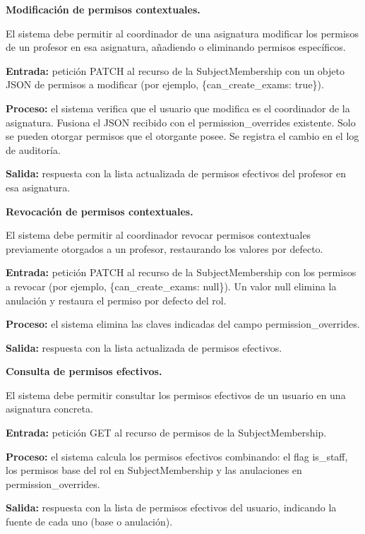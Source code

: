 \begin{functional}
\begin{functional}
    \item \textbf{Modificación de permisos contextuales.}

    El sistema debe permitir al coordinador de una asignatura modificar los permisos de un profesor en esa asignatura, añadiendo o eliminando permisos específicos.

    \textbf{Entrada:} petición PATCH al recurso de la SubjectMembership con un objeto JSON de permisos a modificar (por ejemplo, \{can\_create\_exams: true\}).

    \textbf{Proceso:} el sistema verifica que el usuario que modifica es el coordinador de la asignatura. Fusiona el JSON recibido con el permission\_overrides existente. Solo se pueden otorgar permisos que el otorgante posee. Se registra el cambio en el log de auditoría.

    \textbf{Salida:} respuesta con la lista actualizada de permisos efectivos del profesor en esa asignatura.

    \item \textbf{Revocación de permisos contextuales.}

    El sistema debe permitir al coordinador revocar permisos contextuales previamente otorgados a un profesor, restaurando los valores por defecto.

    \textbf{Entrada:} petición PATCH al recurso de la SubjectMembership con los permisos a revocar (por ejemplo, \{can\_create\_exams: null\}). Un valor null elimina la anulación y restaura el permiso por defecto del rol.

    \textbf{Proceso:} el sistema elimina las claves indicadas del campo permission\_overrides.

    \textbf{Salida:} respuesta con la lista actualizada de permisos efectivos.

    \item \textbf{Consulta de permisos efectivos.}

    El sistema debe permitir consultar los permisos efectivos de un usuario en una asignatura concreta.

    \textbf{Entrada:} petición GET al recurso de permisos de la SubjectMembership.

    \textbf{Proceso:} el sistema calcula los permisos efectivos combinando: el flag is\_staff, los permisos base del rol en SubjectMembership y las anulaciones en permission\_overrides.

    \textbf{Salida:} respuesta con la lista de permisos efectivos del usuario, indicando la fuente de cada uno (base o anulación).


\end{functional}
\end{functional}
